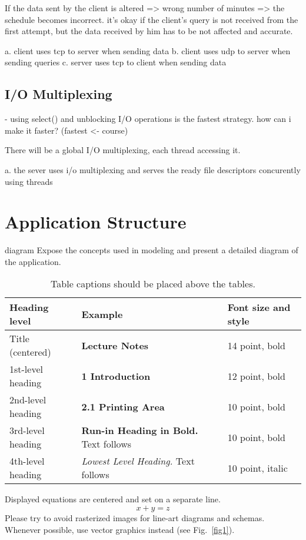 \documentclass[runningheads]{llncs}
\begin{document}
If the data sent by the client is altered => wrong number of minutes => the schedule becomes incorrect. it's okay if the client's query is not received from the first attempt, but the data received by him has to be not affected and accurate.

a. client uses tcp to server when sending data
b. client uses udp to server when sending queries
c. server uses tcp to client when sending data

\subsection{I/O Multiplexing}

- using select() and unblocking I/O operations is the fastest strategy. how can i make it faster? (fastest <- course)

There will be a global I/O multiplexing, each thread accessing it.

a. the sever uses i/o multiplexing and serves the ready file descriptors concurently using threads

\section{Application Structure}

diagram
Expose the concepts used in modeling and present a detailed diagram of the application.

\begin{table}
    \caption{Table captions should be placed above the
    tables.}\label{tab1}
    \begin{tabular}{|l|l|l|}
    \hline
    Heading level &  Example & Font size and style\\
    \hline
    Title (centered) &  {\Large\bfseries Lecture Notes} & 14 point, bold\\
    1st-level heading &  {\large\bfseries 1 Introduction} & 12 point, bold\\
    2nd-level heading & {\bfseries 2.1 Printing Area} & 10 point, bold\\
    3rd-level heading & {\bfseries Run-in Heading in Bold.} Text follows & 10 point, bold\\
    4th-level heading & {\itshape Lowest Level Heading.} Text follows & 10 point, italic\\
    \hline
    \end{tabular}
    \end{table}
    
    
    \noindent Displayed equations are centered and set on a separate
    line.
    \begin{equation}
    x + y = z
    \end{equation}
    Please try to avoid rasterized images for line-art diagrams and
    schemas. Whenever possible, use vector graphics instead (see
    Fig.~\ref{fig1}).
    
\end{document}
